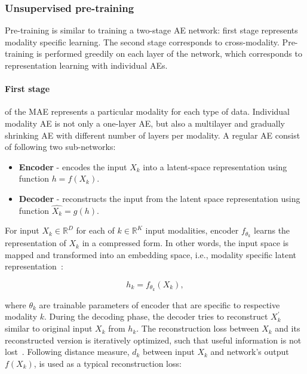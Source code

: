 \subsubsection{Unsupervised pre-training} 
Pre-training is similar to training a two-stage AE network: first stage represents modality specific learning. The second stage corresponds to cross-modality. 
Pre-training is performed greedily on each layer of the network, which corresponds to representation learning with individual AEs. 

\paragraph{First stage}\noindent of the MAE represents a particular modality for each type of data. Individual modality AE is not only a one-layer AE, but also a multilayer and gradually shrinking AE with different number of layers per modality. A regular AE consist of following two sub-networks: 

\begin{itemize}[noitemsep]
    \item \textbf{Encoder} - encodes the input $X_{k}$ into a latent-space representation using function $h = f(X_{k})$.
    \item \textbf{Decoder} - reconstructs the input from the latent space representation using function $\hat{X_k} = g(h)$. 
\end{itemize}

\hspace*{3.5mm} For input $X_{k} \in \mathbb{R}^{D}$ for each of $k \in \mathbb{R}^K$ input modalities, encoder $f_{\theta_{k}}$ learns the representation of $X_{k}$ in a compressed form. In other words, the input space is mapped and transformed into an embedding space, i.e., modality specific latent representation~\cite{mmdcae}: 

\begin{equation}
    h_{k}=f_{\theta_{k}}\left({X}_{k}\right),
\end{equation}

\hspace*{3.5mm} where $\theta_{k}$ are trainable parameters of encoder that are specific to respective modality $k$. During the decoding phase, the decoder tries to reconstruct ${X}_{k}^{\prime}$ similar to original input ${X}_{k}$ from $h_{k}$. The reconstruction loss between $X_{k}$ and its reconstructed version is iteratively optimized, such that useful information is not lost~\cite{KarimIEEEAccess2019}. Following distance measure, $d_{k}$ between input $X_{k}$ and network's output $f(X_{k})$, is used as a typical reconstruction loss: 

